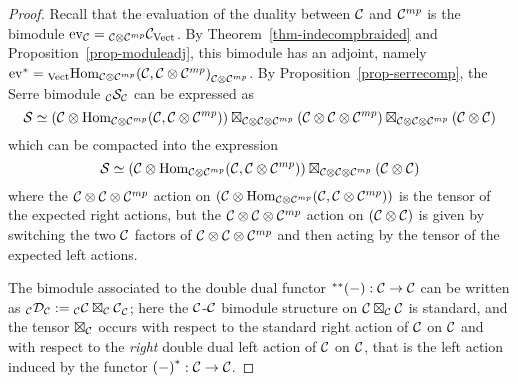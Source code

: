 \documentclass{amsart}
\begin{document}
\begin{proof}


Recall that the evaluation of the duality between $\mathcal C$ and $\mathcal C^{mp}$ is the bimodule $\mathrm{ev}_{\mathcal C} = {}_{\mathcal C \otimes \mathcal C^{mp}} {\mathcal C}_{\mathrm{Vect}}$.  By Theorem~\ref{thm-indecompbraided} and Proposition~\ref{prop-moduleadj}, this bimodule has an adjoint, namely ${\mathrm{ev}}^* = {}_{\mathrm{Vect}} {\operatorname{Hom}_{\mathcal C \otimes \mathcal C^{mp}}(\mathcal C,\mathcal C \otimes \mathcal C^{mp})}_{\mathcal C \otimes \mathcal C^{mp}}$.  By Proposition~\ref{prop-serrecomp}, the Serre bimodule ${}_{\mathcal C} {\mathcal S}_{\mathcal C}$ can be expressed as
\begin{equation} \nonumber
\mathcal S \simeq (\mathcal C \otimes \operatorname{Hom}_{\mathcal C \otimes \mathcal C^{mp}}(\mathcal C,\mathcal C \otimes \mathcal C^{mp})) \boxtimes_{\mathcal C \otimes \mathcal C \otimes \mathcal C^{mp}} (\mathcal C \otimes \mathcal C \otimes \mathcal C^{mp}) \boxtimes_{\mathcal C \otimes \mathcal C \otimes \mathcal C^{mp}} (\mathcal C \otimes \mathcal C)
\end{equation}
which can be compacted into the expression
\begin{equation} \nonumber
\mathcal S \simeq (\mathcal C \otimes \operatorname{Hom}_{\mathcal C \otimes \mathcal C^{mp}}(\mathcal C,\mathcal C \otimes \mathcal C^{mp})) \boxtimes_{\mathcal C \otimes \mathcal C \otimes \mathcal C^{mp}} (\mathcal C \otimes \mathcal C)
\end{equation}
where the $\mathcal C \otimes \mathcal C \otimes \mathcal C^{mp}$ action on $(\mathcal C \otimes \operatorname{Hom}_{\mathcal C \otimes \mathcal C^{mp}}(\mathcal C,\mathcal C \otimes \mathcal C^{mp}))$ is the tensor of the expected right actions, but the $\mathcal C \otimes \mathcal C \otimes \mathcal C^{mp}$ action on $(\mathcal C \otimes \mathcal C)$ is given by switching the two $\mathcal C$ factors of $\mathcal C \otimes \mathcal C \otimes \mathcal C^{mp}$ and then acting by the tensor of the expected left actions.

The bimodule associated to the double dual functor ${}^{**}{(-)}: \mathcal C \rightarrow \mathcal C$ can be written as ${}_{\mathcal C} {\mathcal D}_{\mathcal C} := {}_{\mathcal C} {\mathcal C \boxtimes_{\mathcal C} \mathcal C}_{\mathcal C}$; here the $\mathcal C$-$\mathcal C$ bimodule structure on ${\mathcal C \boxtimes_{\mathcal C} \mathcal C}$ is standard, and the tensor $\boxtimes_{\mathcal C}$ occurs with respect to the standard right action of $\mathcal C$ on $\mathcal C$ and with respect to the \emph{right} double dual left action of $\mathcal C$ on $\mathcal C$, that is the left action induced by the functor ${(-)}^*: \mathcal C \rightarrow \mathcal C$.


\end{proof}
\end{document}
